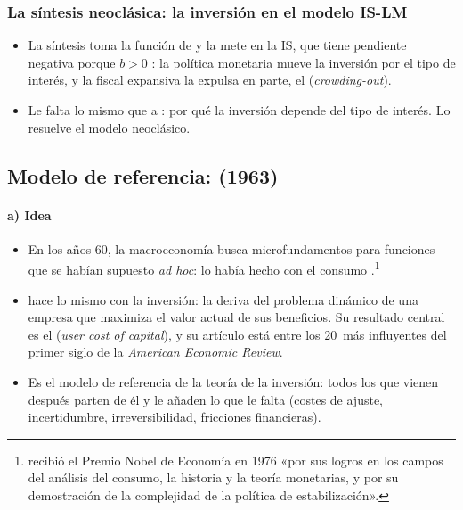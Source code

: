 \documentclass[11pt]{article}
\begin{document}
\subsubsection{La síntesis neoclásica: la inversión en el modelo IS-LM}\label{sec:islm}

\begin{itemize}
\item La síntesis toma la función de  y la mete en la IS, que tiene pendiente negativa porque $b>0$ : la política monetaria mueve la inversión por el tipo de interés, y la fiscal expansiva la expulsa en parte, el  (\emph{crowding-out}).
\item Le falta lo mismo que a : por qué la inversión depende del tipo de interés. Lo resuelve el modelo neoclásico.
\end{itemize}

\subsection{Modelo de referencia:  (1963)}\label{sec:jorgenson}

\paragraph{a) Idea}

\begin{itemize}
\item En los años 60, la macroeconomía busca microfundamentos para funciones que se habían supuesto \emph{ad hoc}: \textcite{Friedman1957} lo había hecho con el consumo .\footnote{ recibió el Premio Nobel de Economía en 1976 «por sus logros en los campos del análisis del consumo, la historia y la teoría monetarias, y por su demostración de la complejidad de la política de estabilización»\nocite{Nobel1976Friedman}.}
\item \textcite{Jorgenson1963Capital} hace lo mismo con la inversión: la deriva del problema dinámico de una empresa que maximiza el valor actual de sus beneficios. Su resultado central es el  (\emph{user cost of capital}), y su artículo está entre los 20~más influyentes del primer siglo de la \emph{American Economic Review}\nocite{ArrowEtAl2011Top20}.
\item Es el modelo de referencia de la teoría de la inversión: todos los que vienen después parten de él y le añaden lo que le falta (costes de ajuste, incertidumbre, irreversibilidad, fricciones financieras).
\end{itemize}
\end{document}
